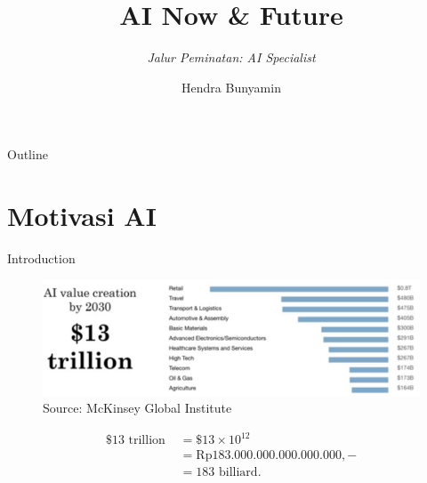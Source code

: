 \documentclass[pdf]{beamer}
\title[AI (Now \& Future )] %
{\textbf{AI Now \& Future}}
\subtitle
{\textit{Jalur Peminatan: AI Specialist}}
\author[Hendra Bunyamin] %
{Hendra Bunyamin}
\institute[ ] %
{
  Program Studi Teknik Informatika\\
  Fakultas Teknologi Informasi\\
  Universitas Kristen Maranatha
}
\theoremstyle{mystyle}
\begin{document}
\begin{frame}
  \titlepage
\end{frame}

\begin{frame}{Outline}
  \tableofcontents
\end{frame}






\section{Motivasi AI}
\begin{frame}{Introduction}
	\begin{figure}[!ht]
		\centering
		\includegraphics[scale=.225]{AI-value-creation}
		\caption{Source: McKinsey Global Institute~\citep{ng2019AIForEveryone}}
		\label{fig:ai-value-creation}
	\end{figure}
	\begin{align*}
	\$13 \text{ trillion } &= \$13 \times 10^{12} \\
	                       &= \text{Rp}183.000.000.000.000.000,- \\
                           &= 183 \text{ billiard}.	                       	
	\end{align*}	  
\end{frame}
\end{document}
